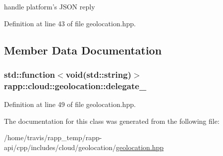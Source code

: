 handle platform's J\-S\-O\-N reply 



Definition at line 43 of file geolocation.\-hpp.



\subsection{Member Data Documentation}
\hypertarget{classrapp_1_1cloud_1_1geolocation_a7404b97bd414a0a112fde589db81f36a}{
\subsubsection[{delegate\-\_\-}]{\setlength{\rightskip}{0pt plus 5cm}std\-::function$<$void(std\-::string)$>$ rapp\-::cloud\-::geolocation\-::delegate\-\_\-\hspace{0.3cm}{\ttfamily [private]}}}\label{classrapp_1_1cloud_1_1geolocation_a7404b97bd414a0a112fde589db81f36a}


Definition at line 49 of file geolocation.\-hpp.



The documentation for this class was generated from the following file\-:\begin{DoxyCompactItemize}
\item 
/home/travis/rapp\-\_\-temp/rapp-\/api/cpp/includes/cloud/geolocation/\hyperlink{geolocation_8hpp}{geolocation.\-hpp}\end{DoxyCompactItemize}
